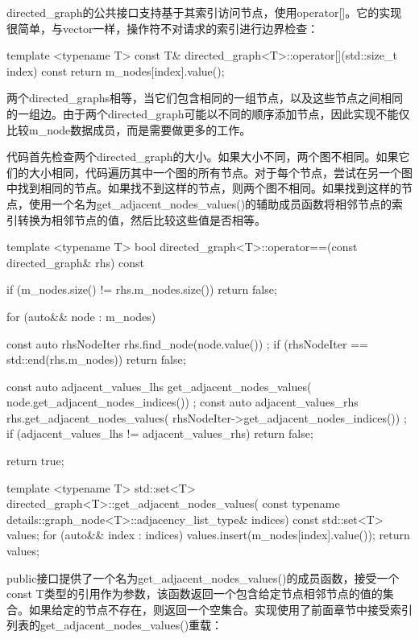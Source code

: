 directed\_graph的公共接口支持基于其索引访问节点，使用operator[]。它的实现很简单，与vector一样，操作符不对请求的索引进行边界检查：

\begin{cpp}
template <typename T>
const T& directed_graph<T>::operator[](std::size_t index) const
{
    return m_nodes[index].value();
}
\end{cpp}


两个directed\_graphs相等，当它们包含相同的一组节点，以及这些节点之间相同的一组边。由于两个directed\_graph可能以不同的顺序添加节点，因此实现不能仅比较m\_node数据成员，而是需要做更多的工作。

代码首先检查两个directed\_graph的大小。如果大小不同，两个图不相同。如果它们的大小相同，代码遍历其中一个图的所有节点。对于每个节点，尝试在另一个图中找到相同的节点。如果找不到这样的节点，则两个图不相同。如果找到这样的节点，使用一个名为get\_adjacent\_nodes\_values()的辅助成员函数将相邻节点的索引转换为相邻节点的值，然后比较这些值是否相等。

\begin{cpp}
template <typename T>
bool directed_graph<T>::operator==(const directed_graph& rhs) const
{
    if (m_nodes.size() != rhs.m_nodes.size()) { return false; }

    for (auto&& node : m_nodes) {
        const auto rhsNodeIter { rhs.find_node(node.value()) };
        if (rhsNodeIter == std::end(rhs.m_nodes)) { return false; }

        const auto adjacent_values_lhs { get_adjacent_nodes_values(
            node.get_adjacent_nodes_indices()) };
        const auto adjacent_values_rhs { rhs.get_adjacent_nodes_values(
            rhsNodeIter->get_adjacent_nodes_indices()) };
        if (adjacent_values_lhs != adjacent_values_rhs) { return false; }
    }
    return true;
}

template <typename T>
std::set<T> directed_graph<T>::get_adjacent_nodes_values(
    const typename details::graph_node<T>::adjacency_list_type& indices) const
{
    std::set<T> values;
    for (auto&& index : indices) { values.insert(m_nodes[index].value()); }
    return values;
}
\end{cpp}


public接口提供了一个名为get\_adjacent\_nodes\_values()的成员函数，接受一个const T类型的引用作为参数，该函数返回一个包含给定节点相邻节点的值的集合。如果给定的节点不存在，则返回一个空集合。实现使用了前面章节中接受索引列表的get\_adjacent\_nodes\_values()重载：


